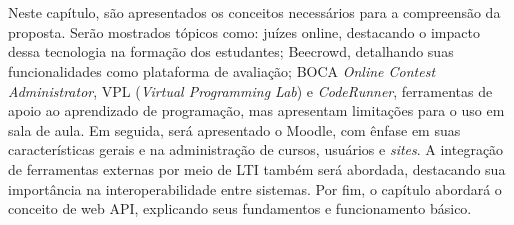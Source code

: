 

\chapter{}

Neste capítulo, são apresentados os conceitos necessários para a compreensão da proposta. Serão mostrados tópicos como: juízes online, destacando o impacto dessa tecnologia na formação dos estudantes; Beecrowd, detalhando suas funcionalidades como plataforma de avaliação; BOCA \textit{Online Contest Administrator}, VPL (\textit{Virtual Programming Lab}) e \textit{CodeRunner},  ferramentas de apoio ao aprendizado de programação, mas apresentam limitações para o uso em sala de aula. Em seguida, será apresentado o Moodle, com ênfase em suas características gerais e na administração de cursos, usuários e \textit{sites}. A integração de ferramentas externas por meio de LTI também será abordada, destacando sua importância na interoperabilidade entre sistemas. Por fim, o capítulo abordará o conceito de web API, explicando seus fundamentos e funcionamento básico.

